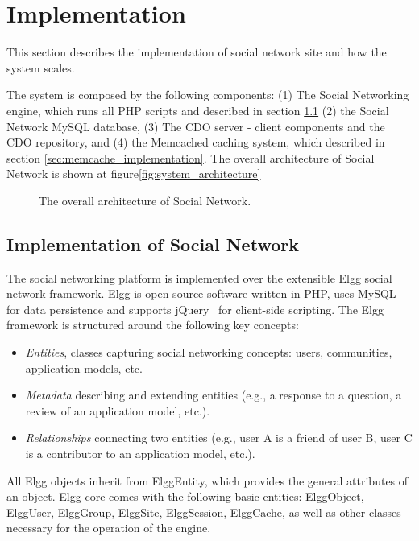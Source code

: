 \chapter{Implementation}

This section describes the implementation of social network site
and how the system scales.

The system is composed by the following components: (1) The Social Networking engine, which runs all PHP scripts and described in section \ref{sec:implementaion_of_social_netowrk} (2) the Social Network MySQL database, (3) The CDO server - client components and the CDO repository, and (4) the Memcached caching system, which described in section \ref{sec:memcache_implementation}.
The overall architecture of Social Network is shown at figure\ref{fig:system_architecture}

\begin{figure}[h]
	\caption{The overall architecture of Social Network.}
	\centering
	\label{fig:elgg_architecture}
\end{figure}

\section{Implementation of Social Network}
\label{sec:implementaion_of_social_netowrk}
The social networking platform is implemented over the extensible Elgg social network framework\cite{elgg_url}.  Elgg is open source software written in PHP, uses MySQL for data persistence and supports jQuery~\cite{jquery_url} for client-side scripting.  The Elgg framework is structured around the following key concepts:
\begin{itemize}
\item \emph{Entities}, classes capturing social networking concepts: users, communities, application models, etc.
\item \emph{Metadata} describing and extending entities (e.g., a response to a question, a review of an application model, etc.).
\item  \emph{Relationships} connecting two entities (e.g., user A is a friend of user B, user C is a contributor to an application model, etc.).
\end{itemize}
All Elgg objects inherit from ElggEntity, which provides the general attributes of an object. Elgg core comes with the following basic entities: ElggObject, ElggUser, ElggGroup, ElggSite, ElggSession, ElggCache, as well as other classes necessary for the operation of the engine.

